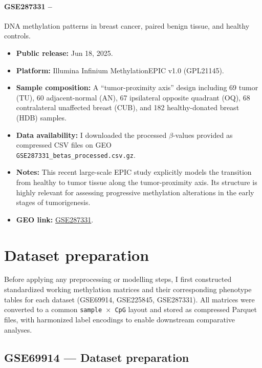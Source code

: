 \documentclass[10pt]{extarticle}
\begin{document}
\paragraph{GSE287331 --} DNA methylation patterns in breast cancer, paired benign tissue, and healthy controls.  
\begin{itemize}[label=-]
  \item \textbf{Public release:} Jun 18, 2025.
  \item \textbf{Platform:} Illumina Infinium MethylationEPIC v1.0 (GPL21145).  
  \item \textbf{Sample composition:} A “tumor-proximity axis” design including 69 tumor (TU), 60 adjacent-normal (AN), 67 ipsilateral opposite quadrant (OQ), 68 contralateral unaffected breast (CUB), and 182 healthy-donated breast (HDB) samples.
  \item \textbf{Data availability:} I downloaded the processed $\beta$-values provided as compressed CSV files on GEO \\ \texttt{GSE287331\_betas\_processed.csv.gz}.
  \item \textbf{Notes:} This recent large-scale EPIC study explicitly models the transition from healthy to tumor tissue along the tumor-proximity axis. Its structure is highly relevant for assessing progressive methylation alterations in the early stages of tumorigenesis.
  \item \textbf{GEO link:} \href{https://www.ncbi.nlm.nih.gov/geo/query/acc.cgi?acc=GSE287331}{GSE287331}.
\end{itemize}



\section{Dataset preparation}
Before applying any preprocessing or modelling steps, I first constructed standardized working methylation matrices and their corresponding phenotype tables for each dataset (GSE69914, GSE225845, GSE287331).  
All matrices were converted to a common \texttt{sample~$\times$~CpG} layout and stored as compressed Parquet files, with harmonized label encodings to enable downstream comparative analyses.

\subsection{GSE69914 — Dataset preparation}
\end{document}
